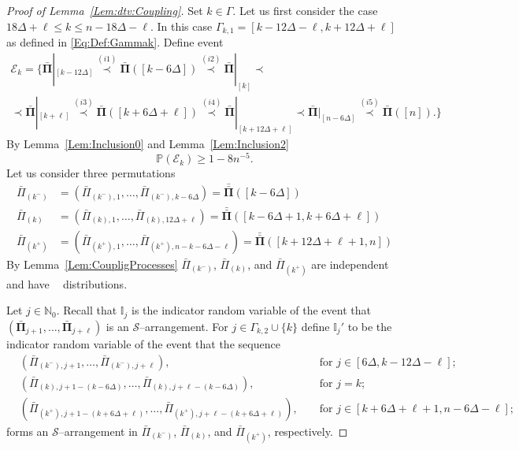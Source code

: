 \documentclass[letterpaper,11pt]{article}
\theoremstyle{definition}
\theoremstyle{remark}
\renewcommand{\le}{\leqslant}
\renewcommand{\ge}{\geqslant}
\DeclareMathOperator{\Mallows}{Mallows_{seq}}
\newcommand{\Pra}[1]{\mathbb{P}\left(#1\right)}
\newcommand{\Ind}{\mathbb{I}}
\newcommand{\barpi}{\bar \varPi}
\newcommand{\barPi}{\bar {\mathbf \Pi}}
\newcommand{\barbarPi}{{\bar{\bar {\mathbf \Pi}}}}
\newcommand{\NN}{\mathbb{N}}
\newcommand{\cS}{\mathcal{S}}
\newcommand{\cE}{\mathcal{E}}
\newcommand{\subseq}{\prec}
\begin{document}
\begin{proof}[Proof of Lemma~\ref{Lem:dtv:Coupling}]
	
	\medskip
	
	Set $k\in \Gamma$. Let us first consider the case 
	$18\Delta+\ell\le k\le n-18\Delta-\ell$. In this case $\Gamma_{k,1}=[k-12\Delta-\ell,k+12\Delta+\ell]$ as defined in \eqref{Eq:Def:Gammak}. 
	Define event
	\begin{multline}\label{Eq:Ek:Def2}
		\cE_k=
		\{\barPi|_{[k-12\Delta]}\stackrel{(i1)}{\subseq} \barPi([k-6\Delta])\stackrel{(i2)}{\subseq} \barPi|_{[k]}\subseq\\
		\subseq \barPi|_{[k+\ell]}\stackrel{(i3)}{\subseq} \barPi([k+6\Delta+\ell])\stackrel{(i4)}{\subseq} \barPi|_{[k+12\Delta+\ell]}\subseq \barPi|_{[n-6\Delta]}\stackrel{(i5)}{\subseq} \barPi([n]).
		\}
	\end{multline}
	By Lemma~\ref{Lem:Inclusion0} and Lemma~\ref{Lem:Inclusion2}
	\begin{equation}
		\Pra{\cE_k}\ge 1-8n^{-5}.
	\end{equation}
	Let us consider three permutations
	\begin{align*}
		\barpi_{(k^-)}
		&=(\barpi_{(k^-),1},\ldots,\barpi_{(k^-),k-6\Delta})=
		\barbarPi([k-6\Delta])\\
		\barpi_{(k)}
		&=(\barpi_{(k),1},\ldots,\barpi_{(k),12\Delta+\ell})=
		\barbarPi([k-6\Delta+1,k+6\Delta+\ell])\\
		\barpi_{(k^+)}
		&=(\barpi_{(k^+),1},\ldots,\barpi_{(k^+),n-k-6\Delta-\ell})=
		\barbarPi([k+12\Delta+\ell+1,n])
	\end{align*}
	By Lemma~\ref{Lem:CoupligProcesses} $\barpi_{(k^-)}$, $\barpi_{(k)}$, and $\barpi_{(k^+)}$ are independent and have $\Mallows$ distributions.
	
	Let $j\in \NN_0$. Recall that
	$\Ind_j$ is the indicator random variable of the event that $(\barPi_{j+1},\ldots,\barPi_{j+\ell})$ is an $\cS$--arrangement.  
	For $j\in \Gamma_{k,2}\cup \{k\}$ define $\Ind_j'$ to be the indicator random variable of the event that the sequence
	\begin{align*}
		\nonumber	&(\barpi_{(k^-),j+1},\dots,\barpi_{(k^-),j+\ell}), &&\text{ for } j\in [6\Delta, k-12\Delta-\ell];\\	&(\barpi_{(k),j+1-(k-6\Delta)},\dots,\barpi_{(k),j+\ell-(k-6\Delta)}), &&\text{ for } j=k;\\ 
		\nonumber	&(\barpi_{(k^+),j+1-(k+6\Delta+\ell)},\dots,\barpi_{(k^+),j+\ell-(k+6\Delta+\ell)}), &&\text{ for } j\in [k+6\Delta+\ell+1,n-6\Delta-\ell];
	\end{align*}  
	forms an $\cS$--arrangement in $\barpi_{(k^-)}$, $\barpi_{(k)}$, and $\barpi_{(k^+)}$, respectively.
	

\end{proof}
\end{document}
